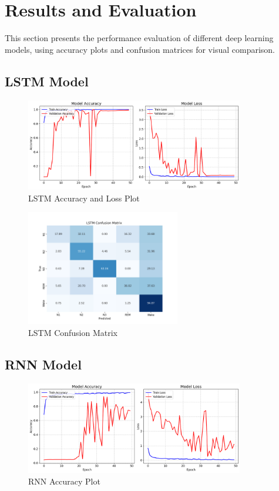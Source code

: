 \section{Results and Evaluation}

This section presents the performance evaluation of different deep learning models, using accuracy plots and confusion matrices for visual comparison.

\subsection{LSTM Model}

\begin{figure}[H]
	\centering
	\includegraphics[width=0.85\textwidth]{img/paper_2/lstm accuracy and loss plot.png}
	\caption{LSTM Accuracy and Loss Plot}
	\label{fig:lstm_accuracy}
\end{figure}

\begin{figure}[H]
	\centering
	\includegraphics[width=0.6\textwidth]{img/paper_2/LSTM_cm.png}
	\caption{LSTM Confusion Matrix}
	\label{fig:lstm_cm}
\end{figure}

\subsection{RNN Model}

\begin{figure}[H]
	\centering
	\includegraphics[width=0.85\textwidth]{img/paper_2/Rnn Accuracy Plot.png}
	\caption{RNN Accuracy Plot}
	\label{fig:rnn_accuracy}
\end{figure}


